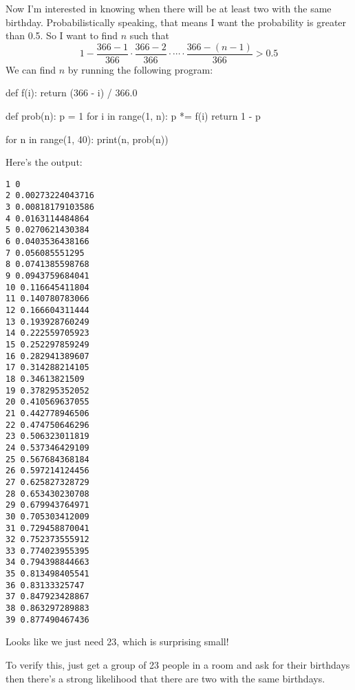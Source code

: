 Now I'm interested in knowing when there will be
at least two with the same birthday.
Probabilistically speaking,
that means I want the probability is greater than 0.5.
So I want to find $n$ such that
\[
1 - \frac{366 - 1}{366} \cdot 
\frac{366 - 2}{366} \cdot \cdots \cdot
\frac{366 - (n - 1)}{366} > 0.5
\]
We can find $n$ by running the following program:
\begin{console}[fontsize=\small]
def f(i): 
    return (366 - i) / 366.0

def prob(n):
    p = 1
    for i in range(1, n):
        p *= f(i)
    return 1 - p

for n in range(1, 40):
    print(n, prob(n))
\end{console}
Here's the output:
\begin{Verbatim}[frame=single, commandchars=\\\{\}, fontsize=\small]
1 0
2 0.00273224043716
3 0.00818179103586
4 0.0163114484864
5 0.0270621430384
6 0.0403536438166
7 0.056085551295
8 0.0741385598768
9 0.0943759684041
10 0.116645411804
11 0.140780783066
12 0.166604311444
13 0.193928760249
14 0.222559705923
15 0.252297859249
16 0.282941389607
17 0.314288214105
18 0.34613821509
19 0.378295352052
20 0.410569637055
21 0.442778946506
22 0.474750646296
23 0.506323011819
24 0.537346429109
25 0.567684368184
26 0.597214124456
27 0.625827328729
28 0.653430230708
29 0.679943764971
30 0.705303412009
31 0.729458870041
32 0.752373555912
33 0.774023955395
34 0.794398844663
35 0.813498405541
36 0.83133325747
37 0.847923428867
38 0.863297289883
39 0.877490467436
\end{Verbatim}
Looks like we just need 23, which is surprising small!

To verify this, just get a group of 23 people in a room and ask for their
birthdays then there's a strong likelihood that there are two with the same
birthdays.

